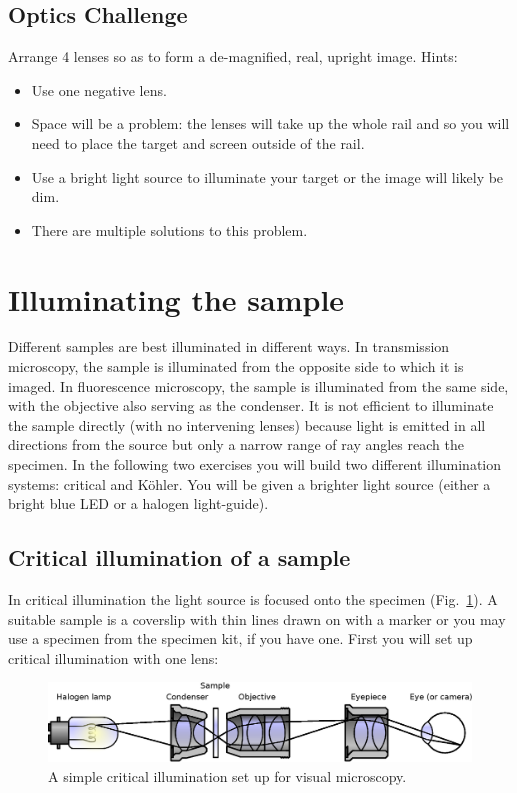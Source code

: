 \documentclass[a4paper]{report}
\begin{document}
\subsection{Optics Challenge}
Arrange 4 lenses so as to form a de-magnified, real, upright
image. Hints: 
\begin{itemize}
\item Use one negative lens.
\item Space will be a problem: the lenses will take up the whole rail and so you will need to place the target and screen outside of the rail.
\item Use a bright light source to illuminate your target or the image will likely be dim. 
\item There are multiple solutions to this problem.
\end{itemize}


\clearpage
\section{Illuminating the sample}
Different samples are best illuminated in different ways.
In transmission microscopy, the sample is illuminated from the opposite side to which it is imaged. 
In fluorescence microscopy, the sample is illuminated from the same side, with the objective also serving as the condenser. 
It is not efficient to illuminate the sample directly (with no intervening lenses) because light is emitted in all directions from the source but only a narrow range of ray angles reach the specimen. 
In the following two exercises you will build two different illumination systems: critical and K\"{o}hler. 
You will be given a brighter light source (either a bright blue LED or a halogen light-guide).


\subsection{Critical illumination of a sample}
In critical illumination the light source is focused onto the specimen (Fig.~\ref{critIlum}).
A suitable sample is a coverslip with thin lines drawn on with a marker or you may use a specimen from the specimen kit, if you have one.
First you will set up critical illumination with one lens:

\begin{figure}[h]
\center
\includegraphics[width=5in]{Critical_Illumination.eps}
\caption{A simple critical illumination set up for visual microscopy.}
\label{critIlum}
\end{figure}
\end{document}
